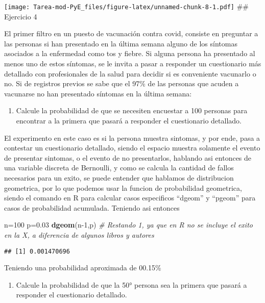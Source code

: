 \documentclass[
]{article}
\newenvironment{Shaded}{\begin{snugshade}}{\end{snugshade}}
\newcommand{\CommentTok}[1]{\textcolor[rgb]{0.56,0.35,0.01}{\textit{#1}}}
\newcommand{\DecValTok}[1]{\textcolor[rgb]{0.00,0.00,0.81}{#1}}
\newcommand{\FloatTok}[1]{\textcolor[rgb]{0.00,0.00,0.81}{#1}}
\newcommand{\FunctionTok}[1]{\textcolor[rgb]{0.13,0.29,0.53}{\textbf{#1}}}
\newcommand{\NormalTok}[1]{#1}
\newcommand{\OtherTok}[1]{\textcolor[rgb]{0.56,0.35,0.01}{#1}}
\providecommand{\tightlist}{%
  \setlength{\itemsep}{0pt}\setlength{\parskip}{0pt}}
\begin{document}
\texttt{[image: Tarea-mod-PyE\_files/figure-latex/unnamed-chunk-8-1.pdf]}
\#\# Ejercicio 4

El primer filtro en un puesto de vacunación contra covid, consiste en
preguntar a las personas si han presentado en la última semana alguno de
los síntomas asociados a la enfermedad como tos y fiebre. Si alguna
persona ha presentado al menos uno de estos síntomas, se le invita a
pasar a responder un cuestionario más detallado con profesionales de la
salud para decidir si es conveniente vacunarlo o no. Si de registros
previos se sabe que el 97\% de las personas que acuden a vacunarse no
han presentado síntomas en la última semana:

\begin{enumerate}
\def\labelenumi{\arabic{enumi}.}
\tightlist
\item
  Calcule la probabilidad de que se necesiten encuestar a 100 personas
  para encontrar a la primera que pasará a responder el cuestionario
  detallado.
\end{enumerate}

El experimento en este caso es si la persona muestra sintomas, y por
ende, pasa a contestar un cuestionario detallado, siendo el espacio
muestra solamente el evento de presentar sintomas, o el evento de no
presentarlos, hablando asi entonces de una variable discreta de
Bernoulli, y como se calcula la cantidad de fallos necesarios para un
exito, se puede entender que hablamos de distribucion geometrica, por lo
que podemos usar la funcion de probabilidad geometrica, siendo el
comando en R para calcular casos especificos ``dgeom'' y ``pgeom'' para
casos de probabilidad acumulada. Teniendo asi entonces

\begin{Shaded}
\begin{Highlighting}[]
\NormalTok{n}\OtherTok{=}\DecValTok{100}
\NormalTok{p}\OtherTok{=}\FloatTok{0.03}
\FunctionTok{dgeom}\NormalTok{(n}\DecValTok{{-}1}\NormalTok{,p) }\CommentTok{\# Restando 1, ya que en R no se incluye el exito en la X, a diferencia de algunos libros y autores}
\end{Highlighting}
\end{Shaded}

\begin{verbatim}
## [1] 0.001470696
\end{verbatim}

Teniendo una probabilidad aproximada de 00.15\%

\begin{enumerate}
\def\labelenumi{\arabic{enumi}.}
\setcounter{enumi}{1}
\tightlist
\item
  Calcule la probabilidad de que la 50° persona sea la primera que
  pasará a responder el cuestionario detallado.
\end{enumerate}
\end{document}
